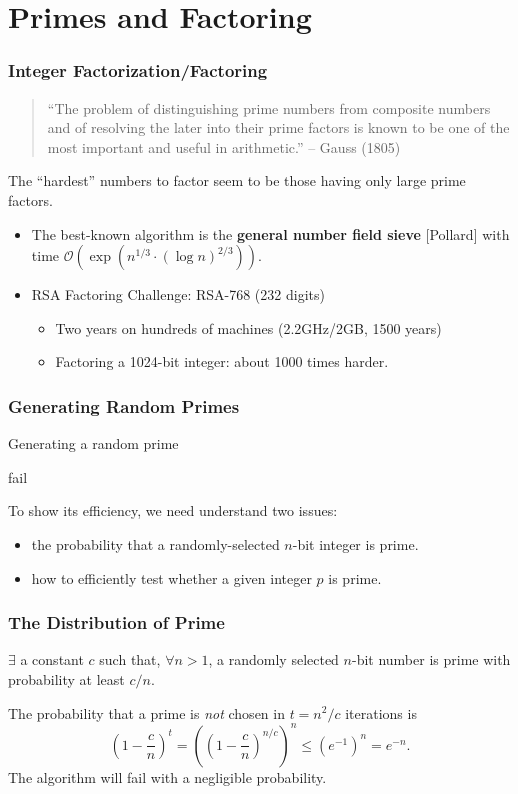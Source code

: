 \section{Primes and Factoring}
\begin{frame}\frametitle{Integer Factorization/Factoring}
\begin{quote}
``The problem of distinguishing prime numbers from composite numbers and of resolving the later into their prime factors is known to be one of the most important and useful in arithmetic.'' -- Gauss (1805)
\end{quote}

The ``hardest'' numbers to factor seem to be those having only large prime factors.
\begin{itemize}
\item The best-known algorithm is the \textbf{general number field sieve} [Pollard] with time $\mathcal{O}(\exp(n^{1/3}\cdot(\log n)^{2/3}))$.
\item RSA Factoring Challenge: RSA-768 (232 digits)
\begin{itemize}
\item Two years on hundreds of machines (2.2GHz/2GB, 1500 years)
\item Factoring a 1024-bit integer: about 1000 times harder.
\end{itemize}
\end{itemize}
\end{frame}
\begin{frame}\frametitle{Generating Random Primes}
\begin{algorithm}[H]
\DontPrintSemicolon
\caption{Generating a random prime}
\BlankLine
{}
\Return fail
\end{algorithm}
To show its efficiency, we need understand two issues:
\begin{itemize}
\item the probability that a randomly-selected $n$-bit integer is prime.
\item how to efficiently test whether a given integer $p$ is prime.
\end{itemize}
\end{frame}
\begin{frame}\frametitle{The Distribution of Prime}
\begin{theorem}
$\exists$ a constant $c$ such that, $\forall n>1$, a randomly selected $n$-bit number is prime with probability at least $c/n$.
\end{theorem}
The probability that a prime is \emph{not} chosen in $t = n^2/c$ iterations is
\[ \left( 1-\frac{c}{n} \right)^t = \left( \left( 1-\frac{c}{n} \right)^{n/c} \right)^n \le \left( e^{-1} \right)^n = e^{-n}.
\]
The algorithm will fail with a negligible probability.
\end{frame}

